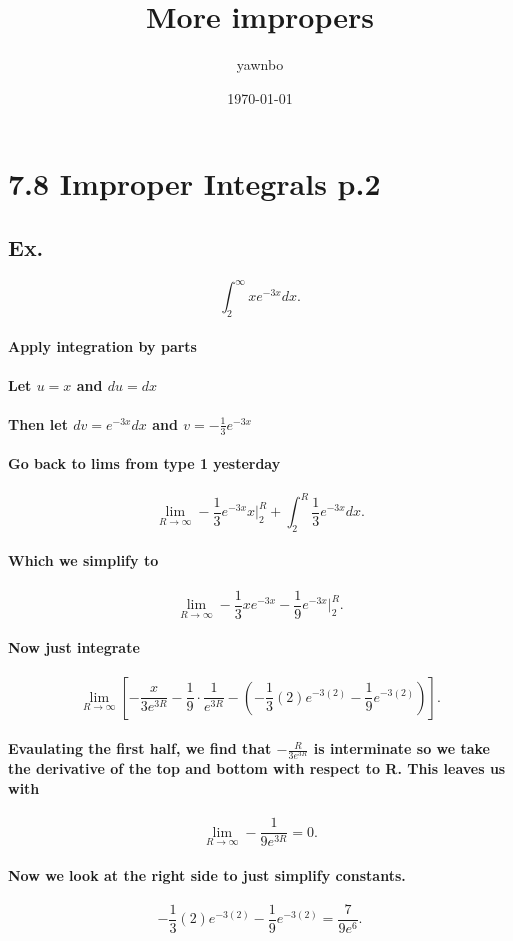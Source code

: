 \documentclass[a4paper]{article}
\title{More impropers}
\author{yawnbo}
\date{\today}
\begin{document}
\section{7.8 Improper Integrals p.2}%
\label{sec:7.8 Improper Integrals p.2}
\subsection{Ex.}%
\label{sub:Ex.}
\[
\int_{2}^{\infty} xe^{-3x}dx
.\] 
\paragraph{Apply integration by parts}
\paragraph{Let $u=x$ and $du=dx$}
\paragraph{Then let $dv=e^{-3x}dx$ and $v=-\frac{1}{3}e^{-3x}$}
\paragraph{Go back to lims from type 1 yesterday}

\[
\lim_{R \to \infty} -\frac{1}{3}e^{-3x}x |_{2}^{R}+\int_{2}^{R} \frac{1}{3}e^{-3x}dx
.\] 
\paragraph{Which we simplify to }
\[
\lim_{R \to \infty} -\frac{1}{3}xe^{-3x}-\frac{1}{9}e^{-3x}|_{2}^{R}
.\] 
\paragraph{Now just integrate}
\[
  \lim_{R \to \infty} \left[-\frac{x}{3e^{3R}}-\frac{1}{9}\cdot \frac{1}{e^{3R}}-\left(-\frac{1}{3}(2)e^{-3(2)} - \frac{1}{9}e^{-3(2)}\right)\right]
.\] 

\paragraph{Evaulating the first half, we find that $-\frac{R}{3e^{3R}}$ is interminate so we take the derivative of the top and bottom with respect to R. This leaves us with}
\[
\lim_{R \to \infty} -\frac{1}{9e^{3R}}=0
.\] 
\paragraph{Now we look at the right side to just simplify constants. }
\[
-\frac{1}{3}(2)e^{-3(2)} - \frac{1}{9}e^{-3(2)} = \frac{7}{9e^{6}}
.\] 
\newpage
\end{document}
